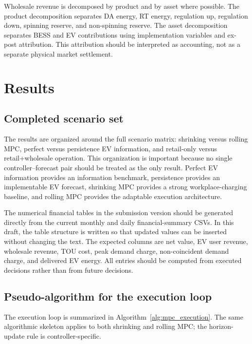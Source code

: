 \documentclass[final,5p,times]{elsarticle}
\begin{document}
Wholesale revenue is decomposed by product and by asset where possible. The product decomposition separates DA energy, RT energy, regulation up, regulation down, spinning reserve, and non-spinning reserve. The asset decomposition separates BESS and EV contributions using implementation variables and ex-post attribution. This attribution should be interpreted as accounting, not as a separate physical market settlement.

\section{Results}
\label{sec:results}

\subsection{Completed scenario set}
The results are organized around the full scenario matrix:
shrinking versus rolling MPC, perfect versus persistence EV information, and retail-only versus retail+wholesale operation. This organization is important because no single controller--forecast pair should be treated as the only result. Perfect EV information provides an information benchmark, persistence provides an implementable EV forecast, shrinking MPC provides a strong workplace-charging baseline, and rolling MPC provides the adaptable execution architecture.

The numerical financial tables in the submission version should be generated directly from the current monthly and daily financial-summary CSVs. In this draft, the table structure is written so that updated values can be inserted without changing the text. The expected columns are net value, EV user revenue, wholesale revenue, TOU cost, peak demand charge, non-coincident demand charge, and delivered EV energy. All entries should be computed from executed decisions rather than from future decisions.

\subsection{Pseudo-algorithm for the execution loop}
The execution loop is summarized in Algorithm~\ref{alg:mpc_execution}. The same algorithmic skeleton applies to both shrinking and rolling MPC; the horizon-update rule is controller-specific.
\end{document}
